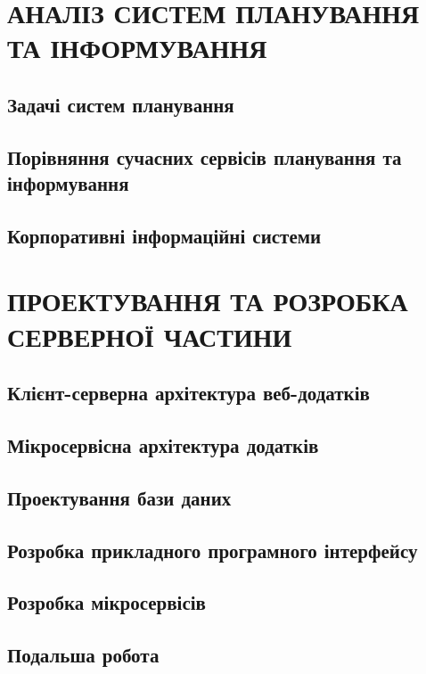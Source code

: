 \documentclass[a4paper,14pt]{extarticle} %
\begin{document}

\tableofcontents %
\clearpage


\section{АНАЛІЗ СИСТЕМ ПЛАНУВАННЯ ТА ІНФОРМУВАННЯ}
\subsection{Задачі систем планування} 

\subsection{Порівняння сучасних сервісів планування та інформування} 




\subsection{Корпоративні інформаційні системи} 



\section{ПРОЕКТУВАННЯ ТА РОЗРОБКА СЕРВЕРНОЇ ЧАСТИНИ}
\subsection{Клієнт-серверна архітектура веб-додатків} 
\subsection{Мікросервісна архітектура додатків} 

\subsection{Проектування бази даних}






\subsection{Розробка прикладного програмного інтерфейсу} 





\subsection{Розробка мікросервісів} 



\subsection{Подальша робота}


\end{document}
